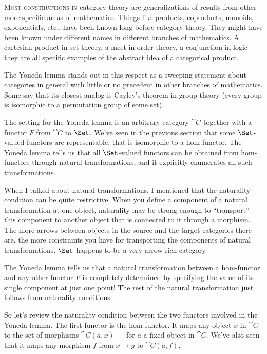 \lettrine[lhang=0.17]{M}{ost constructions in} category theory are generalizations of results
from other more specific areas of mathematics. Things like products,
coproducts, monoids, exponentials, etc., have been known long before
category theory. They might have been known under different names in
different branches of mathematics. A cartesian product in set theory, a
meet in order theory, a conjunction in logic --- they are all specific
examples of the abstract idea of a categorical product.

The Yoneda lemma stands out in this respect as a sweeping statement
about categories in general with little or no precedent in other
branches of mathematics. Some say that its closest analog is Cayley's
theorem in group theory (every group is isomorphic to a permutation
group of some set).

The setting for the Yoneda lemma is an arbitrary category $\cat{C}$
together with a functor $F$ from $\cat{C}$ to $\Set$. We've
seen in the previous section that some $\Set$-valued functors are
representable, that is isomorphic to a hom-functor. The Yoneda lemma
tells us that all $\Set$-valued functors can be obtained from
hom-functors through natural transformations, and it explicitly
enumerates all such transformations.

When I talked about natural transformations, I mentioned that the
naturality condition can be quite restrictive. When you define a
component of a natural transformation at one object, naturality may be
strong enough to ``transport'' this component to another object that is
connected to it through a morphism. The more arrows between objects in
the source and the target categories there are, the more constraints you
have for transporting the components of natural transformations.
$\Set$ happens to be a very arrow-rich category.

The Yoneda lemma tells us that a natural transformation between a
hom-functor and any other functor $F$ is completely determined by
specifying the value of its single component at just one point! The rest
of the natural transformation just follows from naturality conditions.

So let's review the naturality condition between the two functors
involved in the Yoneda lemma. The first functor is the hom-functor. It
maps any object $x$ in $\cat{C}$ to the set of morphisms
$\cat{C}(a, x)$ --- for $a$ a fixed object in $\cat{C}$. We've
also seen that it maps any morphism $f$ from $x \to y$ to $\cat{C}(a, f)$.

